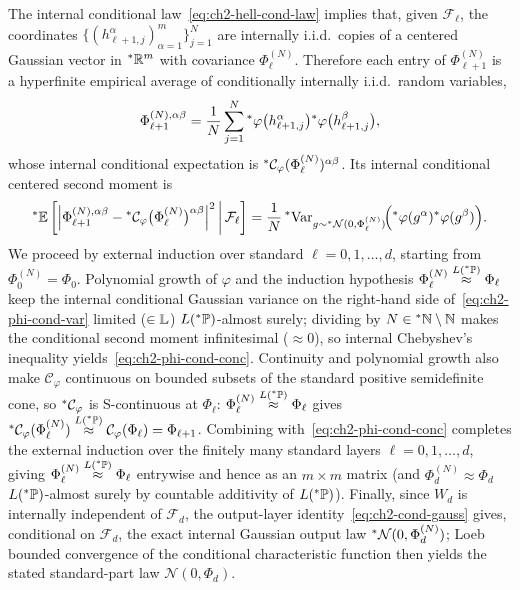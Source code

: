 \begin{proofsketch}
The internal conditional law~\eqref{eq:ch2-hell-cond-law} implies that, given $\mathcal{F}_\ell$, the coordinates $\{(h_{\ell+1,j}^\alpha)_{\alpha=1}^{m}\}_{j=1}^{N}$ are internally i.i.d.\ copies of a centered Gaussian vector in ${}^*\mathbb{R}^m$ with covariance $\Phi_\ell^{(N)}$. Therefore each entry of $\Phi_{\ell+1}^{(N)}$ is a hyperfinite empirical average of conditionally internally i.i.d.\ random variables,
\begin{equation}\label{eq:ch2-phi-ell1-avg}
\Phi_{\ell+1}^{(N),\alpha\beta} = \frac{1}{N} \sum_{j=1}^{N} {}^*\varphi\bigl(h_{\ell+1,j}^\alpha\bigr){}^*\varphi\bigl(h_{\ell+1,j}^\beta\bigr),
\end{equation}
whose internal conditional expectation is ${}^*\mathcal{C}_\varphi(\Phi_\ell^{(N)})^{\alpha\beta}$. Its internal conditional centered second moment is
\begin{equation}\label{eq:ch2-phi-cond-var}
{}^*\mathbb{E}\left[ \left\lvert \Phi_{\ell+1}^{(N),\alpha\beta} - {}^*\mathcal{C}_\varphi\bigl(\Phi_\ell^{(N)}\bigr)^{\alpha\beta} \right\rvert^2 \,\middle|\, \mathcal{F}_\ell \right]
= \frac{1}{N} \, {}^*\!\operatorname{Var}_{g \sim {}^*\mathcal{N}(0, \Phi_\ell^{(N)})}\!\Bigl({}^*\varphi(g^\alpha){}^*\varphi(g^\beta)\Bigr).
\end{equation}
We proceed by external induction over standard $\ell = 0, 1, \dots, d$, starting from $\Phi_0^{(N)} = \Phi_0$. Polynomial growth of $\varphi$ and the induction hypothesis $\Phi_\ell^{(N)} \stackrel{L({}^*\mathbb{P})}{\approx} \Phi_\ell$ keep the internal conditional Gaussian variance on the right-hand side of~\eqref{eq:ch2-phi-cond-var} limited ($\in \mathbb{L}$) $L({}^*\mathbb{P})$-almost surely; dividing by $N \in {}^*\mathbb{N} \setminus \mathbb{N}$ makes the conditional second moment infinitesimal ($\approx 0$), so internal Chebyshev's inequality yields~\eqref{eq:ch2-phi-cond-conc}. Continuity and polynomial growth also make $\mathcal{C}_\varphi$ continuous on bounded subsets of the standard positive semidefinite cone, so ${}^*\mathcal{C}_\varphi$ is S-continuous at $\Phi_\ell$: $\Phi_\ell^{(N)} \stackrel{L({}^*\mathbb{P})}{\approx} \Phi_\ell$ gives ${}^*\mathcal{C}_\varphi(\Phi_\ell^{(N)}) \stackrel{L({}^*\mathbb{P})}{\approx} \mathcal{C}_\varphi(\Phi_\ell) = \Phi_{\ell+1}$. Combining with~\eqref{eq:ch2-phi-cond-conc} completes the external induction over the finitely many standard layers $\ell = 0, 1, \dots, d$, giving $\Phi_\ell^{(N)} \stackrel{L({}^*\mathbb{P})}{\approx} \Phi_\ell$ entrywise and hence as an $m \times m$ matrix (and $\Phi_d^{(N)} \approx \Phi_d$ $L({}^*\mathbb{P})$-almost surely by countable additivity of $L({}^*\mathbb{P})$). Finally, since $W_d$ is internally independent of $\mathcal{F}_d$, the output-layer identity~\eqref{eq:ch2-cond-gauss} gives, conditional on $\mathcal{F}_d$, the exact internal Gaussian output law ${}^*\mathcal{N}(0, \Phi_d^{(N)})$; Loeb bounded convergence of the conditional characteristic function then yields the stated standard-part law $\mathcal{N}(0, \Phi_d)$.
\end{proofsketch}

